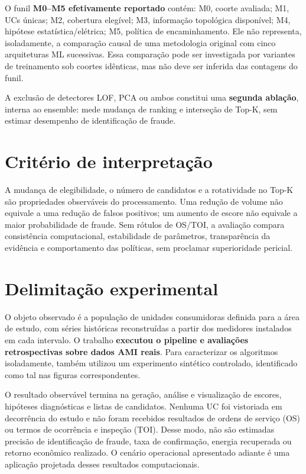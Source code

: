 O funil \textbf{M0--M5 efetivamente reportado} contém: M0, coorte avaliada; M1, UCs únicas; M2, cobertura elegível; M3, informação topológica disponível; M4, hipótese estatística/elétrica; M5, política de encaminhamento. Ele não representa, isoladamente, a comparação causal de uma metodologia original com cinco arquiteturas ML sucessivas. Essa comparação pode ser investigada por variantes de treinamento sob coortes idênticas, mas não deve ser inferida das contagens do funil.

A exclusão de detectores LOF, PCA ou ambos constitui uma \textbf{segunda ablação}, interna ao ensemble: mede mudança de ranking e interseção de Top-K, sem estimar desempenho de identificação de fraude.

\section{Critério de interpretação}\label{crituxe9rio-de-interpretauxe7uxe3o}

A mudança de elegibilidade, o número de candidatos e a rotatividade no Top-K são propriedades observáveis do processamento. Uma redução de volume não equivale a uma redução de falsos positivos; um aumento de escore não equivale a maior probabilidade de fraude. Sem rótulos de OS/TOI, a avaliação compara consistência computacional, estabilidade de parâmetros, transparência da evidência e comportamento das políticas, sem proclamar superioridade pericial.

\section{Delimitação experimental}\label{delimitacao-experimental}

O objeto observado é a população de unidades consumidoras definida para a área de estudo, com séries históricas reconstruídas a partir dos medidores instalados em cada intervalo. O trabalho \textbf{executou o pipeline e avaliações retrospectivas sobre dados AMI reais}. Para caracterizar os algoritmos isoladamente, também utilizou um experimento sintético controlado, identificado como tal nas figuras correspondentes.

O resultado observável termina na geração, análise e visualização de escores, hipóteses diagnósticas e listas de candidatos. Nenhuma UC foi vistoriada em decorrência do estudo e não foram recebidos resultados de ordens de serviço (OS) ou termos de ocorrência e inspeção (TOI). Desse modo, não são estimadas precisão de identificação de fraude, taxa de confirmação, energia recuperada ou retorno econômico realizado. O cenário operacional apresentado adiante é uma aplicação projetada desses resultados computacionais.



